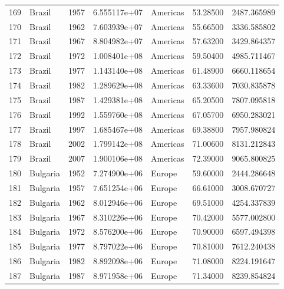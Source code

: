 \documentclass[
  letterpaper,
  DIV=11,
  numbers=noendperiod]{scrreprt}
\begin{document}
\begin{tabular}{llrrlrr}
169  &                    Brazil &  1957 &  6.555117e+07 &  Americas &  53.28500 &    2487.365989 \\
170  &                    Brazil &  1962 &  7.603939e+07 &  Americas &  55.66500 &    3336.585802 \\
171  &                    Brazil &  1967 &  8.804982e+07 &  Americas &  57.63200 &    3429.864357 \\
172  &                    Brazil &  1972 &  1.008401e+08 &  Americas &  59.50400 &    4985.711467 \\
173  &                    Brazil &  1977 &  1.143140e+08 &  Americas &  61.48900 &    6660.118654 \\
174  &                    Brazil &  1982 &  1.289629e+08 &  Americas &  63.33600 &    7030.835878 \\
175  &                    Brazil &  1987 &  1.429381e+08 &  Americas &  65.20500 &    7807.095818 \\
176  &                    Brazil &  1992 &  1.559760e+08 &  Americas &  67.05700 &    6950.283021 \\
177  &                    Brazil &  1997 &  1.685467e+08 &  Americas &  69.38800 &    7957.980824 \\
178  &                    Brazil &  2002 &  1.799142e+08 &  Americas &  71.00600 &    8131.212843 \\
179  &                    Brazil &  2007 &  1.900106e+08 &  Americas &  72.39000 &    9065.800825 \\
180  &                  Bulgaria &  1952 &  7.274900e+06 &    Europe &  59.60000 &    2444.286648 \\
181  &                  Bulgaria &  1957 &  7.651254e+06 &    Europe &  66.61000 &    3008.670727 \\
182  &                  Bulgaria &  1962 &  8.012946e+06 &    Europe &  69.51000 &    4254.337839 \\
183  &                  Bulgaria &  1967 &  8.310226e+06 &    Europe &  70.42000 &    5577.002800 \\
184  &                  Bulgaria &  1972 &  8.576200e+06 &    Europe &  70.90000 &    6597.494398 \\
185  &                  Bulgaria &  1977 &  8.797022e+06 &    Europe &  70.81000 &    7612.240438 \\
186  &                  Bulgaria &  1982 &  8.892098e+06 &    Europe &  71.08000 &    8224.191647 \\
187  &                  Bulgaria &  1987 &  8.971958e+06 &    Europe &  71.34000 &    8239.854824 \\

\end{tabular}
\end{document}
